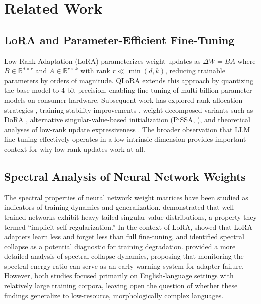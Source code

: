 \documentclass[11pt]{article}
\begin{document}
\section{Related Work}

\subsection{LoRA and Parameter-Efficient Fine-Tuning}

Low-Rank Adaptation (LoRA) \cite{hu2022lora} parameterizes weight updates as $\Delta W = BA$ where $B \in \mathbb{R}^{d \times r}$ and $A \in \mathbb{R}^{r \times k}$ with rank $r \ll \min(d, k)$, reducing trainable parameters by orders of magnitude. QLoRA \cite{dettmers2023qlora} extends this approach by quantizing the base model to 4-bit precision, enabling fine-tuning of multi-billion parameter models on consumer hardware. Subsequent work has explored rank allocation strategies \cite{zhang2023adalora}, training stability improvements \cite{lialin2023relora}, weight-decomposed variants such as DoRA \cite{liu2024dora}, alternative singular-value-based initialization (PiSSA, \cite{meng2024pissa}), and theoretical analyses of low-rank update expressiveness \cite{malladi2023kernel}. The broader observation that LLM fine-tuning effectively operates in a low intrinsic dimension \cite{aghajanyan2021intrinsic} provides important context for why low-rank updates work at all.

\subsection{Spectral Analysis of Neural Network Weights}

The spectral properties of neural network weight matrices have been studied as indicators of training dynamics and generalization. \citet{martin2021implicit} demonstrated that well-trained networks exhibit heavy-tailed singular value distributions, a property they termed ``implicit self-regularization.'' In the context of LoRA, \citet{biderman2024lora} showed that LoRA adapters learn less and forget less than full fine-tuning, and identified spectral collapse as a potential diagnostic for training degradation. \citet{jang2024lora} provided a more detailed analysis of spectral collapse dynamics, proposing that monitoring the spectral energy ratio can serve as an early warning system for adapter failure. However, both studies focused primarily on English-language settings with relatively large training corpora, leaving open the question of whether these findings generalize to low-resource, morphologically complex languages.
\end{document}
